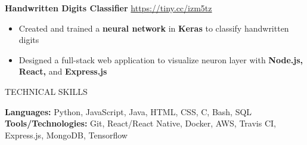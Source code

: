 \documentclass[letterpaper,11pt,oneside]{article}
\newcommand{\createHeading}[1]{
    \vspace{1.25em}
    \hline
    \vspace{-1.5ex}
    \begin{center}
        #1
    \end{center}
    \vspace{-1.5ex}
    \hline
    \vspace{1.25em}
}
\begin{document}
\begin{addmargin}[.6em]{.6em}
\begin{itemize}
    \end{itemize}
    \vspace{1.25em}
    \textbf{Handwritten Digits Classifier} \hfill \href{https://handwritten-digits-ai.netlify.app/}{https://tiny.cc/izm5tz}
    \begin{itemize}
        \item Created and trained a \textbf{neural network} in \textbf{Keras} to classify handwritten digits
        \item Designed a full-stack web application to visualize neuron layer with \textbf{Node.js, React,} and \textbf{Express.js} 
    \end{itemize}
    \vspace{0.5em}
\end{addmargin}

\createHeading{TECHNICAL SKILLS}
\begin{addmargin}[.6em]{.6em}
    \textbf{Languages: } Python, JavaScript, Java, HTML, CSS, C, Bash, SQL \\
    \textbf{Tools/Technologies: } Git, React/React Native, Docker, AWS,  Travis CI, Express.js, MongoDB, Tensorflow
\end{addmargin}
\end{document}
